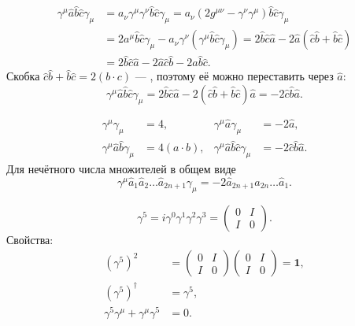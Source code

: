 \documentclass[../final.tex]{subfiles}
\begin{document}
\begin{align*}
    \gamma^\mu\hat a\hat b\hat c\gamma_\mu
    &=a_\nu\gamma^\mu\gamma^\nu\hat b\hat c\gamma_\mu
    =a_\nu\left(2g^{\mu\nu}-\gamma^\nu\gamma^\mu\right)\hat b\hat c\gamma_\mu\\
    &=2a^\mu\hat b\hat c\gamma_\mu-a_\nu\gamma^\nu
    \left(\gamma^\mu\hat b\hat c\gamma_\mu\right)
    =2\hat b\hat c\hat a-2\hat a\left(\hat c\hat b+\hat b\hat c\right)\\
    &=2\hat b\hat c\hat a-2\hat a\hat c\hat b-2\hat a\hat b\hat c.
\end{align*}
Скобка $\hat c\hat b+\hat b\hat c=2(b\cdot c)$ --- , поэтому её
можно переставить через $\hat a$:
\begin{equation*}
    \gamma^\mu\hat a\hat b\hat c\gamma_\mu
    =2\hat b\hat c\hat a-2\left(\hat c\hat b+\hat b\hat c\right)\hat a
    =-2\hat c\hat b\hat a.
\end{equation*}

\answer
\begin{align*}
    \gamma^\mu\gamma_\mu&=4, &
    \gamma^\mu\hat a\gamma_\mu&=-2\hat a,\\
    \gamma^\mu\hat a\hat b\gamma_\mu&=4(a\cdot b), &
    \gamma^\mu\hat a\hat b\hat c\gamma_\mu&=-2\hat c\hat b\hat a.
\end{align*}
Для нечётного числа множителей в общем виде
\begin{equation*}
    \gamma^\mu\hat a_1\hat a_2\ldots\hat a_{2n+1}\gamma_\mu
    =-2\hat a_{2n+1}\hat a_{2n}\ldots\hat a_1.
\end{equation*}


\begin{equation*}
    \gamma^5=i\gamma^0\gamma^1\gamma^2\gamma^3=
    \begin{pmatrix}
        0&I\\
        I&0
    \end{pmatrix}.
\end{equation*}
Свойства:
\begin{align*}
    (\gamma^5)^2&=
    \begin{pmatrix}
        0&I\\
        I&0
    \end{pmatrix}
    \begin{pmatrix}
        0&I\\
        I&0
    \end{pmatrix}
    =\mathbf 1,\\
    (\gamma^5)^\dagger&=\gamma^5,\\
    \gamma^5\gamma^\mu+\gamma^\mu\gamma^5&=0.
\end{align*}
\end{document}
